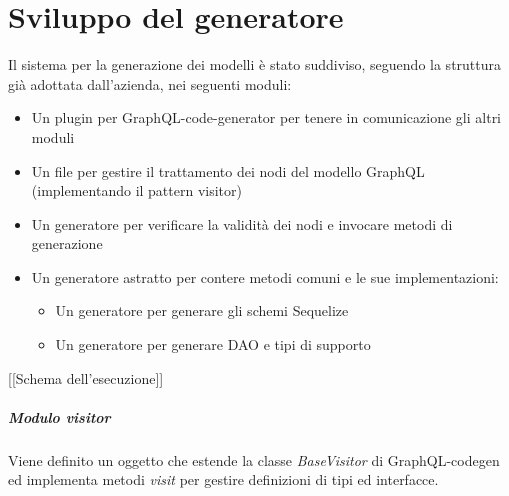 \documentclass[a4paper, 12pt]{report}
\begin{document}
    \chapter{Sviluppo del generatore}
      Il sistema per la generazione dei modelli è stato suddiviso, seguendo la struttura già adottata dall'azienda, nei seguenti moduli:
      \begin{itemize}
        \item Un plugin per GraphQL-code-generator per tenere in comunicazione gli altri moduli
        \item Un file per gestire il trattamento dei nodi del modello GraphQL (implementando il pattern visitor)
        \item Un generatore per verificare la validità dei nodi e invocare metodi di generazione
        \item Un generatore astratto per contere metodi comuni e le sue implementazioni:
        \begin{itemize}
          \item Un generatore per generare gli schemi Sequelize
          \item Un generatore per generare DAO e tipi di supporto
        \end{itemize}
      \end{itemize}

      [[Schema dell'esecuzione]]

      \paragraph*{Modulo visitor}
      Viene definito un oggetto che estende la classe \emph{BaseVisitor} di GraphQL-codegen ed implementa metodi \emph{visit} per gestire definizioni di tipi ed interfacce.
\end{document}
